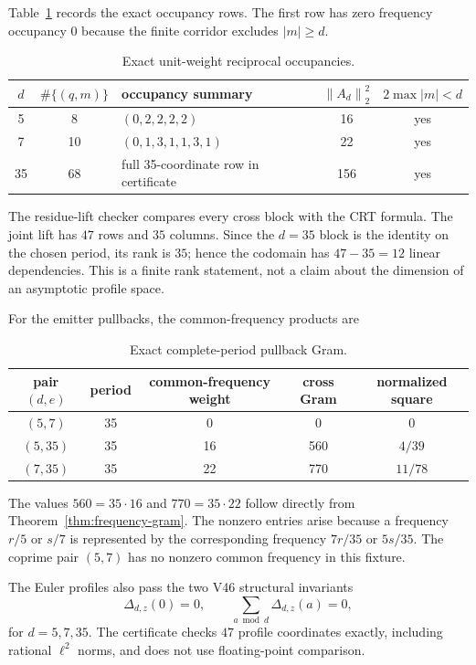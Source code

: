 \documentclass[11pt]{article}
\theoremstyle{definition}
\theoremstyle{remark}
\newcommand{\norm}[1]{\left\lVert #1\right\rVert}
\begin{document}
Table~\ref{tab:emitter} records the exact occupancy rows.  The first row has
zero frequency occupancy $0$ because the finite corridor excludes $|m|\geq d$.
\begin{table}[t]
\centering
\caption{Exact unit-weight reciprocal occupancies.}
\label{tab:emitter}
\begin{tabular}{c|c|l|c|c}
\toprule
$d$ & $\#\{(q,m)\}$ & occupancy summary & $\norm{A_d}_2^2$ & $2\max|m|<d$ \\
\midrule
5  & 8  & $(0,2,2,2,2)$ & 16  & yes \\
7  & 10 & $(0,1,3,1,1,3,1)$ & 22 & yes \\
35 & 68 & full 35-coordinate row in certificate & 156 & yes \\
\bottomrule
\end{tabular}
\end{table}

The residue-lift checker compares every cross block with the CRT formula.
The joint lift has $47$ rows and $35$ columns.  Since the $d=35$ block is the
identity on the chosen period, its rank is $35$; hence the codomain has
$47-35=12$ linear dependencies.  This is a finite rank statement, not a
claim about the dimension of an asymptotic profile space.

For the emitter pullbacks, the common-frequency products are
\begin{table}[t]
\centering
\caption{Exact complete-period pullback Gram.}
\label{tab:cross-gram}
\begin{tabular}{c|c|c|c|c}
\toprule
pair $(d,e)$ & period & common-frequency weight & cross Gram & normalized square \\
\midrule
$(5,7)$   & 35 & 0  & 0   & 0 \\
$(5,35)$  & 35 & 16 & 560 & $4/39$ \\
$(7,35)$  & 35 & 22 & 770 & $11/78$ \\
\bottomrule
\end{tabular}
\end{table}

The values $560=35\cdot16$ and $770=35\cdot22$ follow directly from
Theorem~\ref{thm:frequency-gram}.  The nonzero entries arise because a
frequency $r/5$ or $s/7$ is represented by the corresponding frequency
$7r/35$ or $5s/35$.  The coprime pair $(5,7)$ has no nonzero common frequency
in this fixture.

The Euler profiles also pass the two V46 structural invariants
\begin{equation}
 \Delta_{d,z}(0)=0,
 \qquad \sum_{a\bmod d}\Delta_{d,z}(a)=0,
 \label{eq:delta-invariants}
\end{equation}
for $d=5,7,35$.  The certificate checks $47$ profile coordinates exactly,
including rational $\ell^2$ norms, and does not use floating-point comparison.
\end{document}
